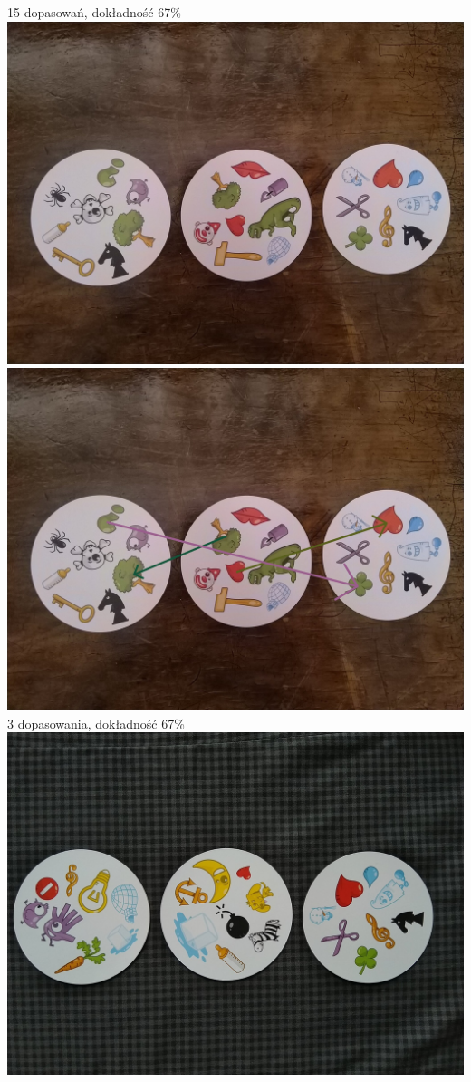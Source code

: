 \documentclass[10pt,a4paper]{article}
\begin{document}
\begin{center}
15 dopasowań, dokładność 67\%
\includegraphics[scale=0.28]{medium/dobble21.jpg}
\includegraphics[scale=0.28]{medium/img_arrows7.jpg}\\
3 dopasowania, dokładność 67\%
\includegraphics[scale=0.28]{medium/dobble24.jpg}

\end{center}
\end{document}
